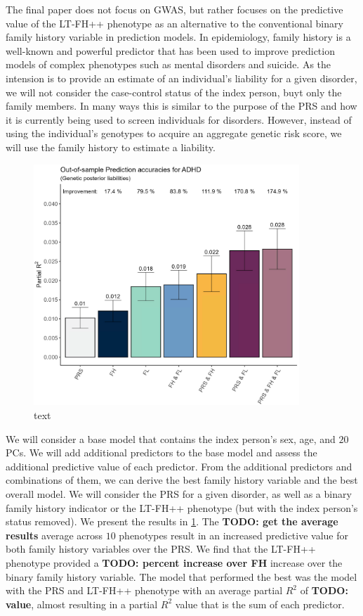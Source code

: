 The final paper does not focus on GWAS, but rather focuses on the predictive value of the LT-FH++ phenotype as an alternative 
to the conventional binary family history variable in prediction models. In epidemiology, family history is a well-known and powerful 
predictor that has been used to improve prediction models of complex phenotypes such as mental disorders and suicide. As the intension 
is to provide an estimate of an individual's liability for a given disorder, we will not consider the case-control status of the index 
person, buyt only the family members. In many ways this is similar to the purpose of the PRS and how it is currently being used to 
screen individuals for disorders. However, instead of using the individual's genotypes to acquire an aggregate genetic risk score, we 
will use the family history to estimate a liability. 

\begin{figure}
	\includegraphics[width=10cm]{results/adhd_predictive_power.png}
	\caption[Out of sample prediction performance]{text}
	\label{fig:paper3:predictionResults}
\end{figure}


We will consider a base model that contains the index person's sex, age, and $ 20 $ PCs. We will add additional predictors to the base 
model and assess the additional predictive value of each predictor. From the additional predictors and combinations of them, we can 
derive the best family history variable and the best overall model. We will consider the PRS for a given disorder, as well as a binary 
family history indicator or the LT-FH++ phenotype (but with the index person's status removed). We present the results in 
\cref{fig:paper3:predictionResults}. The \textbf{TODO: get the average results} average across $ 10 $ phenotypes result in an 
increased predictive value for both family history variables over the PRS. We find that the LT-FH++ phenotype provided a \textbf{TODO: 
percent increase over FH} increase over the binary family history variable. The model that performed the best was the model with the 
PRS and LT-FH++ phenotype with an average partial $ R^2 $ of \textbf{TODO: value}, almost resulting in a partial $ R^2 $ value that is 
the sum of each predictor. 


